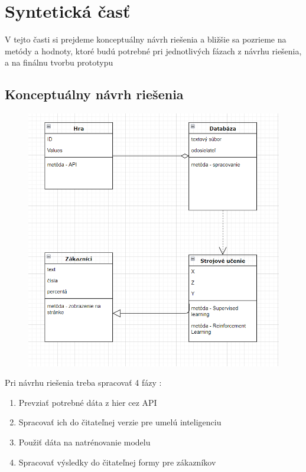 
\chapter{Syntetická časť}
\label{methodology}
V tejto časti si prejdeme konceptuálny návrh riešenia a bližšie sa pozrieme na metódy a hodnoty, ktoré budú potrebné pri jednotlivých fázach z návrhu riešenia, a na finálnu tvorbu prototypu 
\section{Konceptuálny návrh riešenia}

 \begin{figure}[h!]
	
	\includegraphics[width=.9\textwidth]{figures/navrhriesenia}
	\centering
	\caption{  \label{dota2}}
	
\end{figure}

Pri návrhu riešenia treba spracovať 4 fázy : 

\begin{enumerate}
	\item Prevziať potrebné dáta z hier cez API
	\item Spracovať ich do čitateľnej verzie pre umelú inteligenciu
	\item Použiť dáta na natrénovanie modelu
	\item Spracovať výsledky do čitateľnej formy pre zákazníkov
\end{enumerate}


